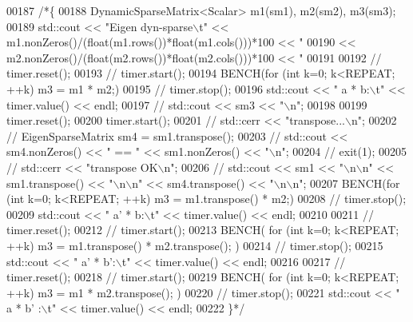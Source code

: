 \begin{DoxyCode}
{{{00187     \textcolor{comment}{/*\{}
00188 \textcolor{comment}{      DynamicSparseMatrix<Scalar> m1(sm1), m2(sm2), m3(sm3);}
00189 \textcolor{comment}{      std::cout << "Eigen dyn-sparse\(\backslash\)t" << m1.nonZeros()/(float(m1.rows())*float(m1.cols()))*100 << "%
00190 \textcolor{comment}{                << m2.nonZeros()/(float(m2.rows())*float(m2.cols()))*100 << "%
00191 \textcolor{comment}{}
00192 \textcolor{comment}{//       timer.reset();}
00193 \textcolor{comment}{//       timer.start();}
00194 \textcolor{comment}{      BENCH(for (int k=0; k<REPEAT; ++k) m3 = m1 * m2;)}
00195 \textcolor{comment}{//       timer.stop();}
00196 \textcolor{comment}{      std::cout << "   a * b:\(\backslash\)t" << timer.value() << endl;}
00197 \textcolor{comment}{//       std::cout << sm3 << "\(\backslash\)n";}
00198 \textcolor{comment}{}
00199 \textcolor{comment}{      timer.reset();}
00200 \textcolor{comment}{      timer.start();}
00201 \textcolor{comment}{//       std::cerr << "transpose...\(\backslash\)n";}
00202 \textcolor{comment}{//       EigenSparseMatrix sm4 = sm1.transpose();}
00203 \textcolor{comment}{//       std::cout << sm4.nonZeros() << " == " << sm1.nonZeros() << "\(\backslash\)n";}
00204 \textcolor{comment}{//       exit(1);}
00205 \textcolor{comment}{//       std::cerr << "transpose OK\(\backslash\)n";}
00206 \textcolor{comment}{//       std::cout << sm1 << "\(\backslash\)n\(\backslash\)n" << sm1.transpose() << "\(\backslash\)n\(\backslash\)n" << sm4.transpose() << "\(\backslash\)n\(\backslash\)n";}
00207 \textcolor{comment}{      BENCH(for (int k=0; k<REPEAT; ++k) m3 = m1.transpose() * m2;)}
00208 \textcolor{comment}{//       timer.stop();}
00209 \textcolor{comment}{      std::cout << "   a' * b:\(\backslash\)t" << timer.value() << endl;}
00210 \textcolor{comment}{}
00211 \textcolor{comment}{//       timer.reset();}
00212 \textcolor{comment}{//       timer.start();}
00213 \textcolor{comment}{      BENCH( for (int k=0; k<REPEAT; ++k) m3 = m1.transpose() * m2.transpose(); )}
00214 \textcolor{comment}{//       timer.stop();}
00215 \textcolor{comment}{      std::cout << "   a' * b':\(\backslash\)t" << timer.value() << endl;}
00216 \textcolor{comment}{}
00217 \textcolor{comment}{//       timer.reset();}
00218 \textcolor{comment}{//       timer.start();}
00219 \textcolor{comment}{      BENCH( for (int k=0; k<REPEAT; ++k) m3 = m1 * m2.transpose(); )}
00220 \textcolor{comment}{//       timer.stop();}
00221 \textcolor{comment}{      std::cout << "   a * b' :\(\backslash\)t" << timer.value() << endl;}
00222 \textcolor{comment}{    \}*/}
}}}}}
\end{DoxyCode}
